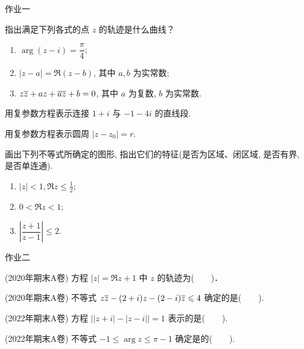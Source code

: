 {
\homework
\begin{frame}[<*>]{作业一}
	\begin{homeworks}
		\item 指出满足下列各式的点 $z$ 的轨迹是什么曲线？
		\begin{enumerate}
			\item $\arg(z-i)=\dfrac\pi4$;
			\item $|z-a|=\Re(z-b)$, 其中 $a,b$ 为实常数;
			\item $z\overline z+az+\overline{az}+b=0$, 其中 $a$ 为复数, $b$ 为实常数.
		\end{enumerate}
		\item 用复参数方程表示连接 $1+i$ 与 $-1-4i$ 的直线段.
		\item 用复参数方程表示圆周 $|z-z_0|=r$.
		\item 画出下列不等式所确定的图形, 指出它们的特征(是否为区域、闭区域, 是否有界, 是否单连通).
		\begin{enumerate}
			\item $|z|<1,\Re z\le \frac12$;
			\item $0<\Re z<1$;
			\item $\left|\dfrac{z+1}{z-1}\right|\le 2$.
		\end{enumerate}
	\end{homeworks}
\end{frame}

\begin{frame}[<*>]{作业二}
	\begin{homeworks}\setcounter{enumi}{4}
		\item(2020年期末A卷) 方程 $|z|=\Re z+1$ 中 $z$ 的轨迹为(~~~~)．
		\item(2020年期末A卷) 不等式 $z\overline z-(2+i)z-(2-i)\overline z\leqslant 4$ 确定的是(~~~~).
		\item(2022年期末A卷) 方程 $\bigl||z+i|-|z-i|\bigr|=1$ 表示的是(~~~~).
		\item(2022年期末A卷) 不等式 $-1\le\arg z\le \pi-1$ 确定是的(~~~~).
	\end{homeworks}
\end{frame}
}